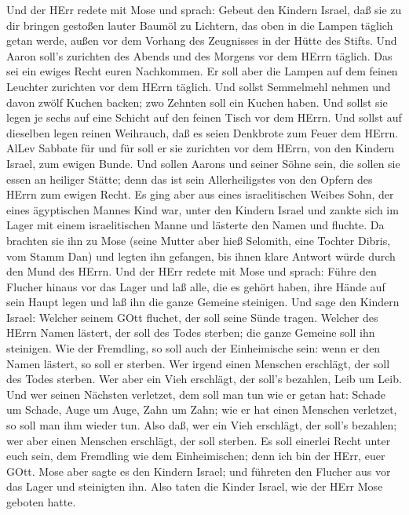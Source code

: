 Und der HErr redete mit Mose und sprach: 
Gebeut den Kindern Israel, daß sie zu dir bringen gestoßen lauter Baumöl
zu Lichtern, das oben in die Lampen täglich getan werde, 
außen vor dem Vorhang des Zeugnisses in der Hütte des Stifts. Und Aaron
soll's zurichten des Abends und des Morgens vor dem HErrn täglich. Das
sei ein ewiges Recht euren Nachkommen.  Er soll aber die
Lampen auf dem feinen Leuchter zurichten vor dem HErrn täglich.
 Und sollst Semmelmehl nehmen und davon zwölf Kuchen backen;
zwo Zehnten soll ein Kuchen haben.  Und sollst sie legen je
sechs auf eine Schicht auf den feinen Tisch vor dem HErrn. 
Und sollst auf dieselben legen reinen Weihrauch, daß es seien Denkbrote
zum Feuer dem HErrn.  AlLev Sabbate für und für soll er sie
zurichten vor dem HErrn, von den Kindern Israel, zum ewigen Bunde.
 Und sollen Aarons und seiner Söhne sein, die sollen sie
essen an heiliger Stätte; denn das ist sein Allerheiligstes von den
Opfern des HErrn zum ewigen Recht.  Es ging aber aus eines
israelitischen Weibes Sohn, der eines ägyptischen Mannes Kind war, unter
den Kindern Israel und zankte sich im Lager mit einem israelitischen
Manne  und lästerte den Namen und fluchte. Da brachten sie
ihn zu Mose (seine Mutter aber hieß Selomith, eine Tochter Dibris, vom
Stamm Dan)  und legten ihn gefangen, bis ihnen klare
Antwort würde durch den Mund des HErrn.  Und der HErr
redete mit Mose und sprach:  Führe den Flucher hinaus vor
das Lager und laß alle, die es gehört haben, ihre Hände auf sein Haupt
legen und laß ihn die ganze Gemeine steinigen.  Und sage
den Kindern Israel: Welcher seinem GOtt fluchet, der soll seine Sünde
tragen.  Welcher des HErrn Namen lästert, der soll des
Todes sterben; die ganze Gemeine soll ihn steinigen. Wie der Fremdling,
so soll auch der Einheimische sein: wenn er den Namen lästert, so soll
er sterben.  Wer irgend einen Menschen erschlägt, der soll
des Todes sterben.  Wer aber ein Vieh erschlägt, der soll's
bezahlen, Leib um Leib.  Und wer seinen Nächsten verletzet,
dem soll man tun wie er getan hat:  Schade um Schade, Auge
um Auge, Zahn um Zahn; wie er hat einen Menschen verletzet, so soll man
ihm wieder tun.  Also daß, wer ein Vieh erschlägt, der
soll's bezahlen; wer aber einen Menschen erschlägt, der soll sterben.
 Es soll einerlei Recht unter euch sein, dem Fremdling wie
dem Einheimischen; denn ich bin der HErr, euer GOtt.  Mose
aber sagte es den Kindern Israel; und führeten den Flucher aus vor das
Lager und steinigten ihn. Also taten die Kinder Israel, wie der HErr
Mose geboten hatte.

